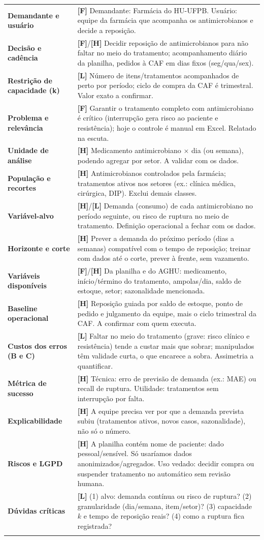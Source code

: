 \documentclass[11pt,a4paper]{article}
\newcommand{\campo}[2]{\textbf{#1} & #2 \\ \addlinespace[2pt]}
\newcommand{\F}{\textbf{\textcolor{verdeF}{[F]}}}
\newcommand{\Hh}{\textbf{\textcolor{laranjaH}{[H]}}}
\newcommand{\Ll}{\textbf{\textcolor{vermelhoL}{[L]}}}
\begin{document}
\begin{tabularx}{\textwidth}{@{}L X@{}}
\toprule
\campo{Demandante e usuário}{\F{} Demandante: Farmácia do HU-UFPB. Usuário: equipe da farmácia que acompanha os antimicrobianos e decide a reposição.}
\campo{Decisão e cadência}{\F{}/\Hh{} Decidir reposição de antimicrobianos para não faltar no meio do tratamento; acompanhamento diário da planilha, pedidos à CAF em dias fixos (seg/qua/sex).}
\campo{Restrição de capacidade (k)}{\Ll{} Número de itens/tratamentos acompanhados de perto por período; ciclo de compra da CAF é trimestral. Valor exato a confirmar.}
\campo{Problema e relevância}{\F{} Garantir o tratamento completo com antimicrobiano é crítico (interrupção gera risco ao paciente e resistência); hoje o controle é manual em Excel. Relatado na escuta.}
\campo{Unidade de análise}{\Hh{} Medicamento antimicrobiano $\times$ dia (ou semana), podendo agregar por setor. A validar com os dados.}
\campo{População e recortes}{\Hh{} Antimicrobianos controlados pela farmácia; tratamentos ativos nos setores (ex.: clínica médica, cirúrgica, DIP). Exclui demais classes.}
\campo{Variável-alvo}{\Hh{}/\Ll{} Demanda (consumo) de cada antimicrobiano no período seguinte, ou risco de ruptura no meio de tratamento. Definição operacional a fechar com os dados.}
\campo{Horizonte e corte}{\Hh{} Prever a demanda do próximo período (dias a semanas) compatível com o tempo de reposição; treinar com dados até o corte, prever à frente, sem vazamento.}
\campo{Variáveis disponíveis}{\F{}/\Hh{} Da planilha e do AGHU: medicamento, início/término do tratamento, ampolas/dia, saldo de estoque, setor; sazonalidade mencionada.}
\campo{Baseline operacional}{\Hh{} Reposição guiada por saldo de estoque, ponto de pedido e julgamento da equipe, mais o ciclo trimestral da CAF. A confirmar com quem executa.}
\campo{Custos dos erros (B e C)}{\Ll{} Faltar no meio do tratamento (grave: risco clínico e resistência) tende a custar mais que sobrar; manipulados têm validade curta, o que encarece a sobra. Assimetria a quantificar.}
\campo{Métrica de sucesso}{\Hh{} Técnica: erro de previsão de demanda (ex.: MAE) ou recall de ruptura. Utilidade: tratamentos sem interrupção por falta.}
\campo{Explicabilidade}{\Hh{} A equipe precisa ver por que a demanda prevista subiu (tratamentos ativos, novos casos, sazonalidade), não só o número.}
\campo{Riscos e LGPD}{\Hh{} A planilha contém nome de paciente: dado pessoal/sensível. Só usaríamos dados anonimizados/agregados. Uso vedado: decidir compra ou suspender tratamento no automático sem revisão humana.}
\campo{Dúvidas críticas}{\Ll{} (1) alvo: demanda contínua ou risco de ruptura? (2) granularidade (dia/semana, item/setor)? (3) capacidade $k$ e tempo de reposição reais? (4) como a ruptura fica registrada?}
\bottomrule
\end{tabularx}
\end{document}
